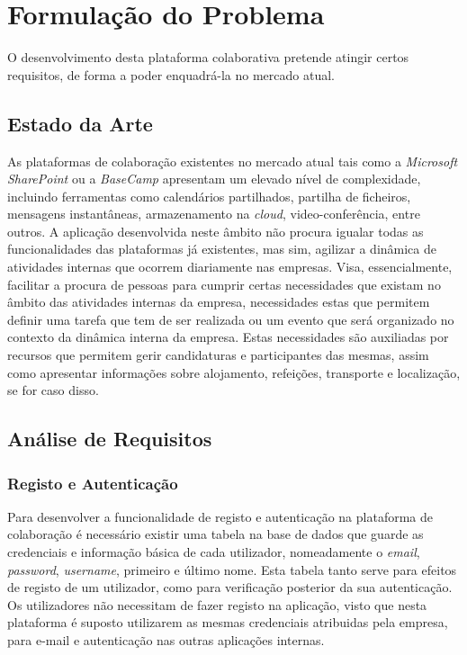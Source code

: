 \chapter{Formulação do Problema}\label{chapter:formulacaoDoProblema}

O desenvolvimento desta plataforma colaborativa pretende atingir certos requisitos, de forma a poder enquadrá-la no mercado 
atual. 


\section{Estado da Arte}\label{sec:estadoDaArte}
As plataformas de colaboração existentes no mercado atual tais como a \textit{Microsoft SharePoint} ou a \textit{BaseCamp} apresentam um elevado nível de complexidade, 
incluindo ferramentas como calendários partilhados, partilha de ficheiros, mensagens instantâneas, armazenamento na \textit{cloud}, video-conferência, entre outros. 
A aplicação desenvolvida neste âmbito não procura igualar todas as funcionalidades das plataformas já existentes, 
mas sim, agilizar a dinâmica de atividades internas que ocorrem diariamente nas empresas. 
Visa, essencialmente, facilitar a procura de pessoas para cumprir certas necessidades que existam no âmbito das atividades internas da empresa, 
necessidades estas que permitem definir uma tarefa que tem de ser realizada ou um evento que será organizado no contexto da dinâmica interna da empresa. 
Estas necessidades são auxiliadas por recursos que permitem gerir candidaturas e participantes das mesmas, 
assim como apresentar informações sobre alojamento, refeições, transporte e localização, se for caso disso.

\section{Análise de Requisitos}\label{sec:requisitos}


\subsection{Registo e Autenticação}\label{subsec:login}
Para desenvolver a funcionalidade de registo e autenticação na plataforma de colaboração é necessário existir uma tabela 
na base de dados que guarde as credenciais e informação básica de cada utilizador, nomeadamente 
o \textit{email}, \textit{password}, \textit{username}, primeiro e último nome. 
Esta tabela tanto serve para efeitos de registo de um utilizador, como para verificação posterior da sua autenticação. 
Os utilizadores não necessitam de fazer registo na aplicação, visto que nesta plataforma é suposto utilizarem 
as mesmas credenciais atribuidas pela empresa, para e-mail e autenticação nas outras aplicações internas.


